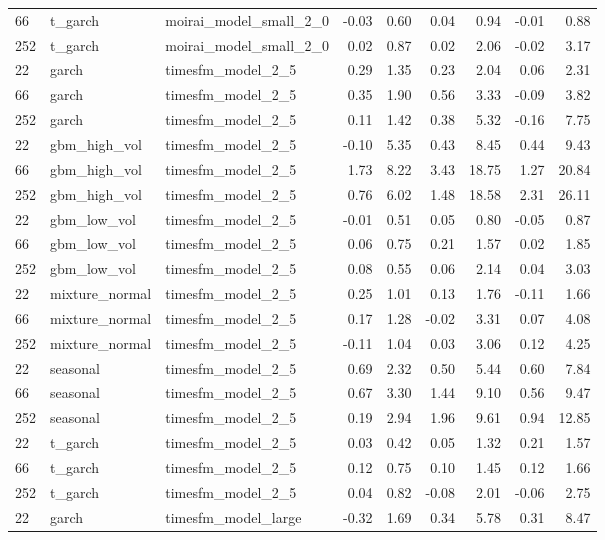 {\begin{tabular}{lllrrrrrr}
66 & t\_garch & moirai\_model\_small\_2\_0 & -0.03 & 0.60 & 0.04 & 0.94 & -0.01 & 0.88 \\
252 & t\_garch & moirai\_model\_small\_2\_0 & 0.02 & 0.87 & 0.02 & 2.06 & -0.02 & 3.17 \\
\midrule
22 & garch & timesfm\_model\_2\_5 & 0.29 & 1.35 & 0.23 & 2.04 & 0.06 & 2.31 \\
66 & garch & timesfm\_model\_2\_5 & 0.35 & 1.90 & 0.56 & 3.33 & -0.09 & 3.82 \\
252 & garch & timesfm\_model\_2\_5 & 0.11 & 1.42 & 0.38 & 5.32 & -0.16 & 7.75 \\
\midrule
22 & gbm\_high\_vol & timesfm\_model\_2\_5 & -0.10 & 5.35 & 0.43 & 8.45 & 0.44 & 9.43 \\
66 & gbm\_high\_vol & timesfm\_model\_2\_5 & 1.73 & 8.22 & 3.43 & 18.75 & 1.27 & 20.84 \\
252 & gbm\_high\_vol & timesfm\_model\_2\_5 & 0.76 & 6.02 & 1.48 & 18.58 & 2.31 & 26.11 \\
\midrule
22 & gbm\_low\_vol & timesfm\_model\_2\_5 & -0.01 & 0.51 & 0.05 & 0.80 & -0.05 & 0.87 \\
66 & gbm\_low\_vol & timesfm\_model\_2\_5 & 0.06 & 0.75 & 0.21 & 1.57 & 0.02 & 1.85 \\
252 & gbm\_low\_vol & timesfm\_model\_2\_5 & 0.08 & 0.55 & 0.06 & 2.14 & 0.04 & 3.03 \\
\midrule
22 & mixture\_normal & timesfm\_model\_2\_5 & 0.25 & 1.01 & 0.13 & 1.76 & -0.11 & 1.66 \\
66 & mixture\_normal & timesfm\_model\_2\_5 & 0.17 & 1.28 & -0.02 & 3.31 & 0.07 & 4.08 \\
252 & mixture\_normal & timesfm\_model\_2\_5 & -0.11 & 1.04 & 0.03 & 3.06 & 0.12 & 4.25 \\
\midrule
22 & seasonal & timesfm\_model\_2\_5 & 0.69 & 2.32 & 0.50 & 5.44 & 0.60 & 7.84 \\
66 & seasonal & timesfm\_model\_2\_5 & 0.67 & 3.30 & 1.44 & 9.10 & 0.56 & 9.47 \\
252 & seasonal & timesfm\_model\_2\_5 & 0.19 & 2.94 & 1.96 & 9.61 & 0.94 & 12.85 \\
\midrule
22 & t\_garch & timesfm\_model\_2\_5 & 0.03 & 0.42 & 0.05 & 1.32 & 0.21 & 1.57 \\
66 & t\_garch & timesfm\_model\_2\_5 & 0.12 & 0.75 & 0.10 & 1.45 & 0.12 & 1.66 \\
252 & t\_garch & timesfm\_model\_2\_5 & 0.04 & 0.82 & -0.08 & 2.01 & -0.06 & 2.75 \\
\midrule
22 & garch & timesfm\_model\_large & -0.32 & 1.69 & 0.34 & 5.78 & 0.31 & 8.47 \\

\end{tabular}}
